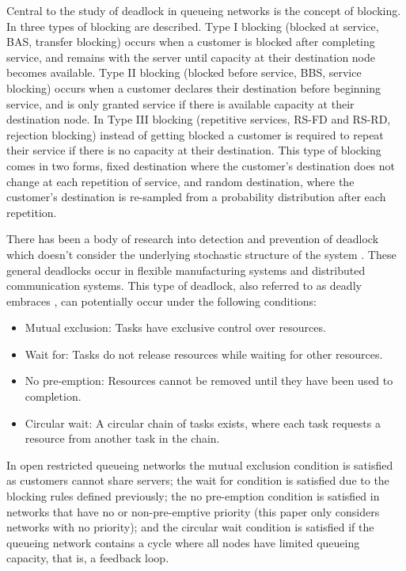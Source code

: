 \documentclass{article}
\numberwithin{equation}{section}
\begin{document}
Central to the study of deadlock in queueing networks is the concept of
blocking.
In \cite{onvuralperros86} three types of blocking are described.
Type I blocking (blocked at service, BAS, transfer blocking) occurs when a
customer is blocked after completing service, and remains with the server
until capacity at their destination node becomes available.
Type II blocking (blocked before service, BBS, service blocking) occurs when a
customer declares their destination before beginning service, and is only
granted service if there is available capacity at their destination node.
In Type III blocking (repetitive services, RS-FD and RS-RD, rejection
blocking) instead of getting blocked a customer is required to repeat their
service if there is no capacity at their destination.
This type of blocking comes in two forms, fixed destination where the
customer's destination does not change at each repetition of service, and
random destination, where the customer's destination is re-sampled from a
probability distribution after each repetition.

There has been a body of research into detection and prevention of deadlock
which doesn't consider the underlying stochastic structure of the system
\cite{coffmanelphick71, reveliotis15a, reveliotis15b}.
These general deadlocks occur in flexible manufacturing systems and
distributed communication systems.
This type of deadlock, also referred to as deadly embraces
\cite{coffmanelphick71}, can potentially occur under the following conditions:
\begin{itemize}
  \item Mutual exclusion: Tasks have exclusive control over resources.
  \item Wait for: Tasks do not release resources while waiting for other
  resources.
  \item No pre-emption: Resources cannot be removed until they have been used
  to completion.
  \item Circular wait: A circular chain of tasks exists, where each task
  requests a resource from another task in the chain.
\end{itemize}

In open restricted queueing networks the mutual exclusion condition is
satisfied as customers cannot share servers; the wait for condition is
satisfied due to the blocking rules defined previously; the no pre-emption
condition is satisfied in networks that have no or non-pre-emptive priority
(this paper only considers networks with no priority); and the circular wait
condition is satisfied if the queueing network contains a cycle where all
nodes have limited queueing capacity, that is, a feedback loop.
\end{document}
